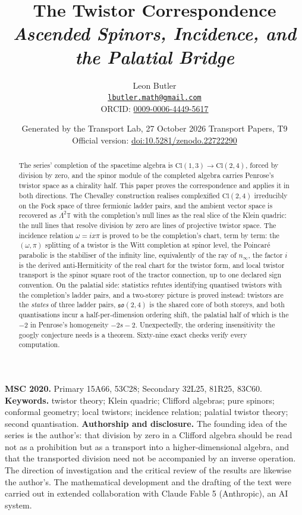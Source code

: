 \documentclass[11pt]{article}
\title{\bfseries The Twistor Correspondence\\[4pt]\large\itshape Ascended Spinors, Incidence, and the Palatial Bridge}
\author{Leon Butler\\ \normalsize\href{mailto:lbutler.math@gmail.com}{\texttt{lbutler.math@gmail.com}}\\ \normalsize ORCID: \href{https://orcid.org/0009-0006-4449-5617}{0009-0006-4449-5617}}
\date{Generated by the Transport Lab, 27 October 2026 \textperiodcentered{} Transport Papers, T9\\[3pt]\small Official version: \href{https://doi.org/10.5281/zenodo.22722290}{doi:10.5281/zenodo.22722290}}
\theoremstyle{definition}
\theoremstyle{plain}
\providecommand{\Cl}{}\renewcommand{\Cl}{\mathrm{Cl}}
\providecommand{\T}{}\renewcommand{\T}{\mathbb{T}}
\providecommand{\nInf}{}\renewcommand{\nInf}{n_\infty}
\begin{document}
\maketitle
\begin{abstract}
\normalsize
The series' completion of the spacetime algebra is $\Cl(1,3) \to \Cl(2,4)$, forced by division by zero, and the spinor module of the completed algebra carries Penrose's twistor space as a chirality half. This paper proves the correspondence and applies it in both directions. The Chevalley construction realises complexified $\Cl(2,4)$ irreducibly on the Fock space of three fermionic ladder pairs, and the ambient vector space is recovered as $\Lambda^2\T$ with the completion's null lines as the real slice of the Klein quadric: the null lines that resolve division by zero are lines of projective twistor space. The incidence relation $\omega = ix\pi$ is proved to be the completion's chart, term by term: the $(\omega,\pi)$ splitting of a twistor is the Witt completion at spinor level, the Poincar\'e parabolic is the stabiliser of the infinity line, equivalently of the ray of $\nInf$, the factor $i$ is the derived anti-Hermiticity of the real chart for the twistor form, and local twistor transport is the spinor square root of the tractor connection, up to one declared sign convention. On the palatial side: statistics refutes identifying quantised twistors with the completion's ladder pairs, and a two-storey picture is proved instead: twistors are the \emph{states} of three ladder pairs, $\mathfrak{so}(2,4)$ is the shared core of both storeys, and both quantisations incur a half-per-dimension ordering shift, the palatial half of which is the $-2$ in Penrose's homogeneity $-2s-2$. Unexpectedly, the ordering insensitivity the googly conjecture needs is a theorem. Sixty-nine exact checks verify every computation.
\end{abstract}
\medskip
\noindent\textbf{MSC 2020.} Primary 15A66, 53C28; Secondary 32L25, 81R25, 83C60.\\
\textbf{Keywords.} twistor theory; Klein quadric; Clifford algebras; pure spinors; conformal geometry; local twistors; incidence relation; palatial twistor theory; second quantisation.
\newpage
\noindent \textbf{Authorship and disclosure. }The founding idea of the series is the author's: that division by zero in a Clifford algebra should be read not as a prohibition but as a transport into a higher-dimensional algebra, and that the transported division need not be accompanied by an inverse operation. The direction of investigation and the critical review of the results are likewise the author's. The mathematical development and the drafting of the text were carried out in extended collaboration with Claude Fable 5 (Anthropic), an AI system.
\end{document}
